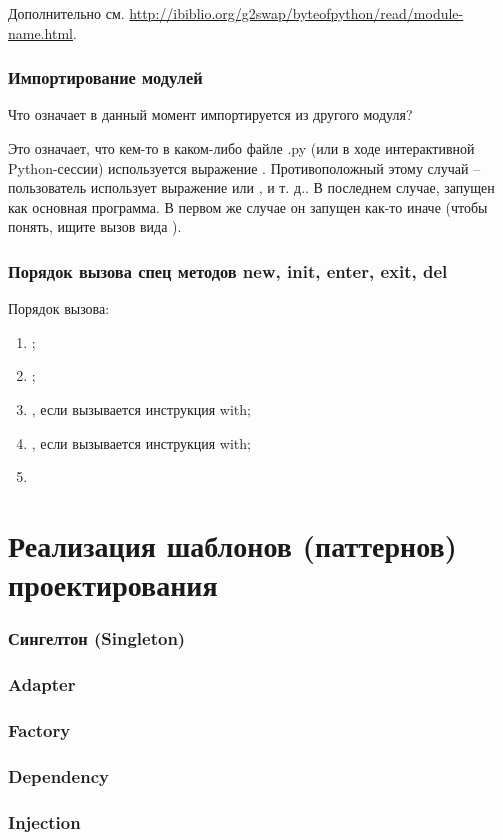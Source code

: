 Дополнительно см. \url{http://ibiblio.org/g2swap/byteofpython/read/module-name.html}.

\section{Импортирование модулей}
Что означает  в данный момент импортируется из другого модуля?

Это означает, что кем-то в каком-либо файле .py (или в ходе интерактивной Python-сессии) используется выражение . Противоположный этому случай – пользователь использует выражение  или , и т. д.. В последнем случае,  запущен как основная программа. В первом же случае он запущен как-то иначе (чтобы понять, ищите вызов вида ).

\section{Порядок вызова спец методов new, init, enter, exit, del}

Порядок вызова:

\begin{enumerate}
	\item {};
	\item {};
	\item {}, если вызывается инструкция with;
	\item {}, если вызывается инструкция with;
	\item {}
\end{enumerate}

\part{Реализация шаблонов (паттернов) проектирования}

\section{Сингелтон (Singleton)}

\linenumbers
{}
\nolinenumbers

\section{Adapter}

\section{Factory}

\section{Dependency}

\section{Injection}
